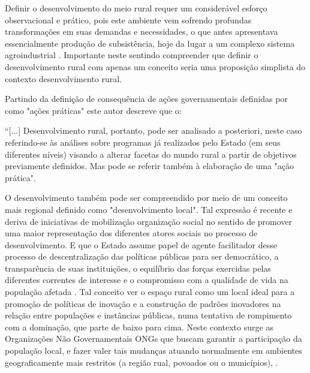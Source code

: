 Definir o desenvolvimento do meio rural requer um considerável esforço observacional e prático, pois este ambiente vem sofrendo profundas transformações em suas demandas e necessidades, o que antes apresentava essencialmente produção de subsistência, hoje da lugar a um complexo sistema agroindustrial \cite{bastos_determinantes_2018}. Importante neste sentindo compreender que definir o desenvolvimento rural com apenas um conceito seria uma proposição simplista do contexto desenvolvimento rural.

Partindo da definição de consequência de ações governamentais definidas por  como "ações práticas" este autor descreve que o:


\begin{citacao}
“[...] Desenvolvimento rural, portanto, pode ser analisado a posteriori, neste caso referindo-se às análises sobre programas já realizados pelo Estado (em seus diferentes níveis) visando a alterar facetas do mundo rural a partir de objetivos previamente definidos. Mas pode se referir também à elaboração de uma "ação prática".
\end{citacao}


O desenvolvimento também pode ser compreendido por meio de um conceito mais regional definido como "desenvolvimento local". Tal expressão é recente e deriva de iniciativas de mobilização organização social no sentido de promover uma maior representação dos diferentes atores sociais no processo de desenvolvimento. E que o Estado assume papel de agente facilitador desse processo de descentralização das políticas públicas  para ser democrático, a transparência de suas instituições, o equilíbrio das forças exercidas pelas diferentes correntes de interesse e o compromisso com a qualidade de vida na população afetada \cite{campanhola_diretrizes_2000}. Tal conceito ver o espaço rural como um local ideal para a promoção de políticas de inovação e a construção de padrões inovadores na relação entre populações e instâncias públicas, numa tentativa de rompimento com a dominação, que parte de baixo para cima. Neste contexto surge as Organizações Não Governamentais ONGs que buscam garantir a participação da população local, e fazer valer tais mudanças atuando normalmente em ambientes geograficamente mais restritos (a região rual, povoados ou o municípios), \cite{assis_agricultura_2005, campanhola_diretrizes_2000}.



